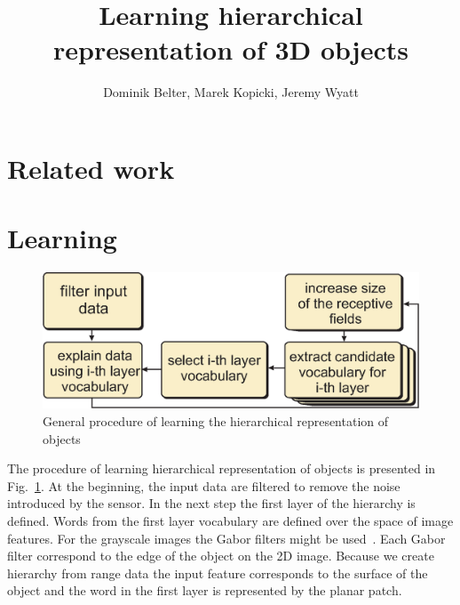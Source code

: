 \documentclass[letterpaper,10pt,conference]{ieeeconf}  %
\title{\LARGE \bf
 Learning hierarchical representation of 3D objects
}
\author{Dominik Belter, Marek Kopicki, Jeremy Wyatt%
}
\begin{document}
\maketitle
\thispagestyle{empty}
\pagestyle{empty}


\begin{abstract}
\end{abstract}



\section{Related work}

\section{Learning}


\begin{figure}[t]
 \centering
\includegraphics[width=0.9\columnwidth]{images/learningGeneral.eps}
\caption{General procedure of learning the hierarchical representation of objects}
 \label{hopProc}
\end{figure}

The procedure of learning hierarchical representation of objects is presented in Fig.~\ref{hopProc}. At the beginning, the input data are filtered to remove the noise introduced by the sensor. In the next step the first layer of the hierarchy is defined. Words from the first layer vocabulary are defined over the space of image features. For the grayscale images the Gabor filters might be used~\cite{Fiedler2014}. Each Gabor filter correspond to the edge of the object on the 2D image. Because we create hierarchy from range data the input feature corresponds to the surface of the object and the word in the first layer is represented by the planar patch. 
\end{document}
